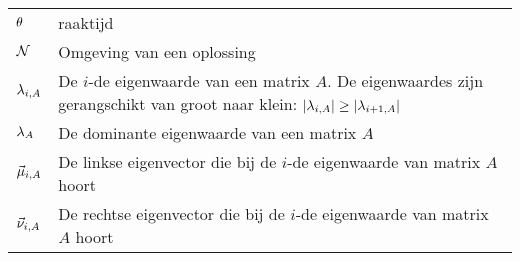 \documentclass[master=elt,masteroption=ge]{kulemt}
\begin{document}
\begin{flushleft}
\begin{tabularx}{\textwidth}{@{}p{22mm}X@{}}
    $\hittime$					& raaktijd\\
    $\neighbr$					& Omgeving van een oplossing\\
    $\ev[i,A]$					& De $i$-de eigenwaarde van een matrix $A$. De eigenwaardes zijn gerangschikt van groot naar klein: $\abs{\ev[i,A]}\geq\abs{\ev[i+1,A]}$\\
    $\ev[A]$					& De dominante eigenwaarde van een matrix $A$\\
    $\evl[i,A]$					& De linkse eigenvector die bij de $i$-de eigenwaarde van matrix $A$ hoort\\
    $\evr[i,A]$					& De rechtse eigenvector die bij de $i$-de eigenwaarde van matrix $A$ hoort\\
  \end{tabularx}
\end{flushleft}

\mainmatter







\appendixpage*          %
\appendix



\backmatter


\end{document}
